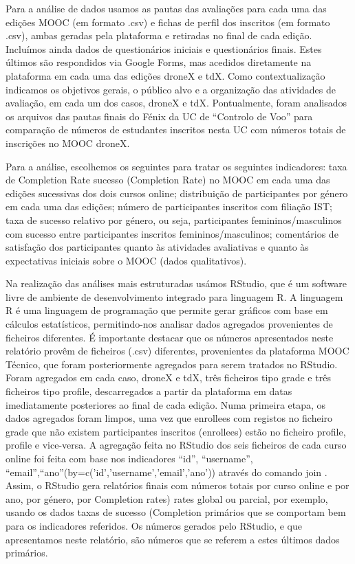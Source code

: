 Para a análise de dados usamos as pautas das avaliações para cada uma das edições
MOOC (em formato .csv) e fichas de perfil dos inscritos (em formato .csv), ambas
geradas pela plataforma e retiradas no final de cada edição. Incluímos ainda dados de
questionários iniciais e questionários finais. Estes últimos são respondidos via Google
Forms, mas acedidos diretamente na plataforma em cada uma das edições droneX e tdX. Como contextualização indicamos os objetivos gerais, o público alvo e a organização das atividades de avaliação, em cada um dos casos, droneX e tdX. Pontualmente, foram analisados os arquivos das pautas finais do Fénix  da UC  de “Controlo de Voo” para comparação de números de estudantes inscritos nesta UC com números totais de inscrições no MOOC droneX.

Para a análise,
escolhemos os seguintes para tratar os seguintes indicadores: taxa de Completion Rate
sucesso (Completion Rate) no MOOC em cada uma das edições sucessivas dos dois cursos online; distribuição de participantes por género em cada uma das edições; número de participantes inscritos com filiação IST; taxa de sucesso relativo por género, ou seja, participantes femininos/masculinos com sucesso entre participantes inscritos femininos/masculinos; comentários de satisfação dos participantes quanto às atividades avaliativas e quanto às expectativas iniciais sobre o MOOC (dados
qualitativos).

Na realização das análises mais estruturadas usámos RStudio, que é um software
livre de ambiente de desenvolvimento integrado para linguagem R. A linguagem R é uma linguagem de programação que permite gerar gráficos com base em cálculos estatísticos, permitindo-nos analisar dados agregados provenientes de ficheiros diferentes. É importante destacar que os números apresentados neste relatório provêm de ficheiros (.csv) diferentes, provenientes da plataforma MOOC Técnico, que foram posteriormente agregados para serem tratados no RStudio. Foram agregados em cada caso, droneX e tdX, três ficheiros tipo grade e três ficheiros tipo profile, descarregados a partir da plataforma em datas imediatamente posteriores ao final de cada edição. Numa primeira etapa, os dados agregados foram limpos, uma vez que
enrollees com registos no ficheiro grade que não existem participantes inscritos (enrollees)
estão no ficheiro profile, profile e vice-versa. A agregação feita no RStudio dos seis ficheiros de cada curso online foi feita com base nos indicadores “id”, “username”,
“email”,“ano”(by=c('id','username','email','ano')) através do comando join . Assim, o RStudio
gera relatórios finais com números totais por curso online e por ano, por género, por
Completion rates) rates global ou parcial, por exemplo, usando os dados taxas de sucesso (Completion primários que se comportam bem para os indicadores referidos. Os números gerados
pelo RStudio, e que apresentamos neste relatório, são números que se referem a
estes últimos dados primários.

